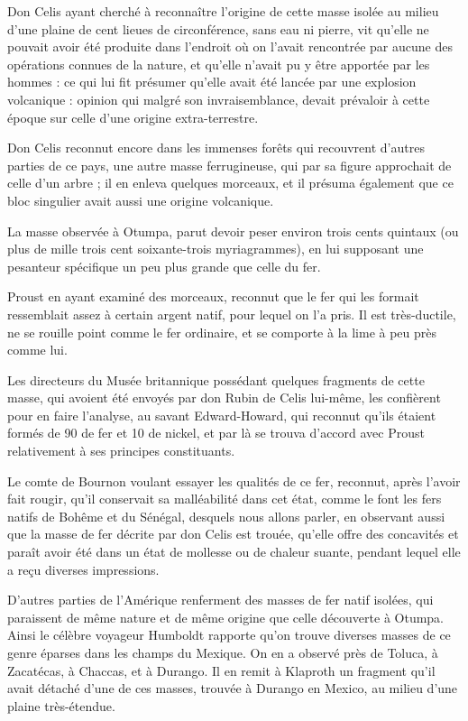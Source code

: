 \documentclass[a4paper, 12pt, oneside, french]{article}
\begin{document}
Don Celis ayant cherché à reconnaître l'origine de cette masse isolée au milieu d'une plaine de cent lieues de circonférence, sans eau ni pierre, vit qu'elle ne pouvait avoir été produite dans l'endroit où on l'avait rencontrée par aucune des opérations connues de la nature, et qu'elle n'avait pu y être apportée par les hommes : ce qui lui fit présumer qu'elle avait été lancée par une explosion volcanique : opinion qui malgré son invraisemblance, devait prévaloir à cette époque sur celle d'une origine extra-terrestre.

Don Celis reconnut encore dans les immenses forêts qui recouvrent d'autres parties de ce pays, une autre masse ferrugineuse, qui par sa figure approchait de celle d'un arbre ; il en enleva quelques morceaux, et il présuma également que ce bloc singulier avait aussi une origine volcanique.

La masse observée à Otumpa, parut devoir peser environ trois cents quintaux (ou plus de mille trois cent soixante-trois myriagrammes), en lui supposant une pesanteur spécifique un peu plus grande que celle du fer.

Proust en ayant examiné des morceaux, reconnut que le fer qui les formait ressemblait assez à certain argent natif, pour lequel on l'a pris. Il est très-ductile, ne se rouille point comme le fer ordinaire, et se comporte à la lime à peu près comme lui.

Les directeurs du Musée britannique possédant quelques fragments de cette masse, qui avoient été envoyés par don Rubin de Celis lui-même, les confièrent pour en faire l'analyse, au savant Edward-Howard, qui reconnut qu'ils étaient formés de 90 de fer et 10 de nickel, et par là se trouva d'accord avec Proust relativement à ses principes constituants.

Le comte de Bournon voulant essayer les qualités de ce fer, reconnut, après l'avoir fait rougir, qu'il conservait sa malléabilité dans cet état, comme le font les fers natifs de Bohême et du Sénégal, desquels nous allons parler, en observant aussi que la masse de fer décrite par don Celis est trouée, qu'elle offre des concavités et paraît avoir été dans un état de mollesse ou de chaleur suante, pendant lequel elle a reçu diverses impressions.

D'autres parties de l'Amérique renferment des masses de fer natif isolées, qui paraissent de même nature et de même origine que celle découverte à Otumpa. Ainsi le célèbre voyageur Humboldt rapporte qu'on trouve diverses masses de ce genre éparses dans les champs du Mexique. On en a observé près de Toluca, à Zacatécas, à Chaccas, et à Durango. Il en remit à Klaproth un fragment qu'il avait détaché d'une de ces masses, trouvée à Durango en Mexico, au milieu d'une plaine très-étendue.
\end{document}
